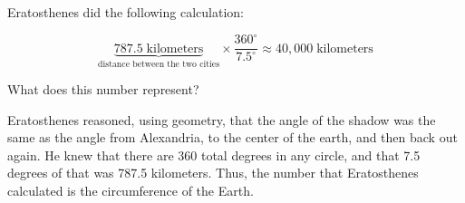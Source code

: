 Eratosthenes did the following calculation:

\[
\underbrace{787.5\;\text{kilometers}}_{\text{distance between the two cities}} \times \frac{360^{\circ}}{7.5^{\circ}} \approx 40,000\;\text{kilometers}
\]

What does this number represent?

  Eratosthenes reasoned,
using geometry, that the angle of the shadow was the same as the angle from Alexandria, to the
center of the earth, and then back out again. He knew that there are 360 total degrees in any
circle, and that 7.5 degrees of that was 787.5 kilometers. Thus, the number that Eratosthenes
calculated is the circumference of the Earth.

